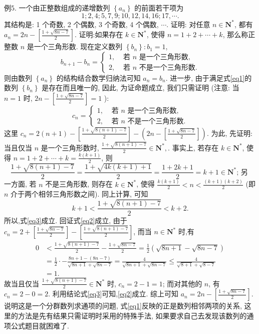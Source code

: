 例5. 一个由正整数组成的递增数列 $\left\{a_n\right\}$ 的前面若干项为
$$
1 ; 2,4 ; 5,7,9 ; 10,12,14,16 ; 17, \cdots .
$$
其结构是: 1 个奇数, 2 个偶数, 3 个奇数, 4 个偶数, $\cdots$.
证明: 对任意 $n \in \mathbf{N}^*$, 都有 $a_n=2 n-\left[\frac{1+\sqrt{8 n-7}}{2}\right]$.
证明:如果存在 $k \in \mathbf{N}^*$, 使得 $n=1+2+\cdots+k$, 那么称正整数 $n$ 是一个三角形数.
现在定义数列 $\left\{b_n\right\}: b_1=1$,
$$
b_{n+1}-b_n= \begin{cases}1, & \text { 若 } n \text { 是一个三角形数, } \\ 2, & \text { 若 } n \text { 不是一个三角形数.
}\end{cases} \label{eq1}
$$
则由数列 $\left\{a_n\right\}$ 的结构结合数学归纳法可知 $a_n=b_n$.
进一步, 由于满足式\ref{eq1}的数列 $\left\{b_n\right\}$ 是存在而且唯一的, 因此, 为证命题成立, 我们只需证明 (注意: 当 $n=1$ 时, $2 n-\left[\frac{1+\sqrt{8 n-7}}{2}\right]=1$ ):
$$
c_n= \begin{cases}1, & \text { 若 } n \text { 是一个三角形数, } \\ 2, & \text { 若 } n \text { 不是一个三角形数.
}\end{cases} \label{eq2}
$$
这里 $c_n=2(n+1)-\left[\frac{1+\sqrt{8(n+1)-7}}{2}\right]-\left(2 n-\left[\frac{1+\sqrt{8 n-7}}{2}\right]\right)$.
为此, 先证明:
当且仅当 $n$ 是一个三角形数时, $\frac{1+\sqrt{8(n+1)-7}}{2} \in \mathbf{N}^*, \label{eq3}$.
事实上, 若存在 $k \in \mathbf{N}^*$, 使得 $n=1+2+\cdots+k=\frac{k(k+1)}{2}$, 则
$$
\frac{1+\sqrt{8(n+1)-7}}{2}=\frac{1+\sqrt{4 k(k+1)+1}}{2}=\frac{1+2 k+1}{2}=k+1 \in \mathbf{N}^* \text {; 另 }
$$
一方面, 若 $n$ 不是三角形数, 则存在 $k \in \mathbf{N}^*$, 使得 $\frac{k(k+1)}{2}<n< \frac{(k+1)(k+2)}{2}$ (即 $n$ 介于两个相邻三角形数之间). 同上计算, 可知
$$
k+1<\frac{1+\sqrt{8(n+1)-7}}{2}<k+2 .
$$
所以,式\ref{eq3}成立.
回证式\ref{eq2}成立, 由于 $c_n=2+\left[\frac{1+\sqrt{8 n-7}}{2}\right]-\left[\frac{1+\sqrt{8(n+1)-7}}{2}\right]$, 而当 $n \in \mathbf{N}^*$ 时,有
$$
\begin{aligned}
0 & <\frac{1+\sqrt{8(n+1)-7}}{2}-\frac{1+\sqrt{8 n-7}}{2}=\frac{1}{2}(\sqrt{8 n+1}-\sqrt{8 n-7}) \\
& =\frac{1}{2} \cdot-\frac{8 n+1-(8 n-7)}{\sqrt{8 n+1}+\sqrt{8 n-7}}=\frac{4}{\sqrt{8 n+1}+\sqrt{8 n-7}} \leqslant \frac{4}{\sqrt{8+1}+\sqrt{8-7}} \\
& =1 .
\end{aligned}
$$
故当且仅当 $\frac{1+\sqrt{8(n+1)-7}}{2} \in \mathbf{N}^*$ 时, $c_n=2-1=1$; 而对其他的 $n$, 有 $c_n=2-0=2$.
利用结论式\ref{eq3}可知,\ref{eq2}成立.
综上可知 $a_n=2 n-\left[\frac{1+\sqrt{8 n-7}}{2}\right]$.
说明这是一个分群数列求通项的问题, 式\ref{eq1}反映的正是数列相邻两项的关系, 这里的方法是先有结果只需证明时采用的特殊手法, 如果要求自己去发现该数列的通项公式题目就困难了.



